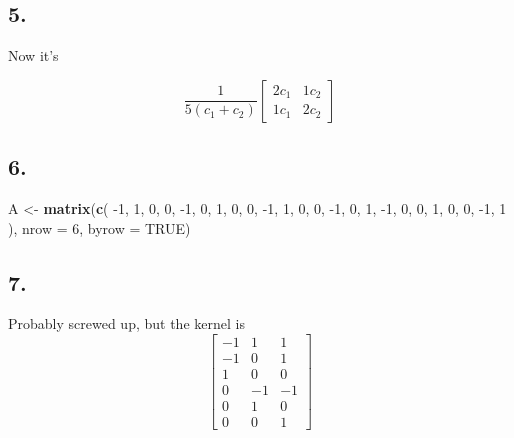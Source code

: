 \documentclass[]{article}
\newenvironment{Shaded}{\begin{snugshade}}{\end{snugshade}}
\newcommand{\DataTypeTok}[1]{\textcolor[rgb]{0.00,0.34,0.68}{#1}}
\newcommand{\DecValTok}[1]{\textcolor[rgb]{0.69,0.50,0.00}{#1}}
\newcommand{\KeywordTok}[1]{\textcolor[rgb]{0.12,0.11,0.11}{\textbf{#1}}}
\newcommand{\NormalTok}[1]{\textcolor[rgb]{0.12,0.11,0.11}{#1}}
\newcommand{\OtherTok}[1]{\textcolor[rgb]{0.00,0.43,0.16}{#1}}
\newcommand{\StringTok}[1]{\textcolor[rgb]{0.75,0.01,0.01}{#1}}
\begin{document}
\hypertarget{section-4}{%
\subsection{5.}\label{section-4}}

Now it's

\[
    \frac {1}{5(c_1 + c_2)}\begin{bmatrix}
    2c_1 & 1c_2\\
    1c_1 & 2c_2
    \end{bmatrix}
\]

\hypertarget{section-5}{%
\subsection{6.}\label{section-5}}

\begin{Shaded}
\begin{Highlighting}[]
\NormalTok{A <-}\StringTok{ }\KeywordTok{matrix}\NormalTok{(}\KeywordTok{c}\NormalTok{(}
  \DecValTok{-1}\NormalTok{, }\DecValTok{1}\NormalTok{, }\DecValTok{0}\NormalTok{, }\DecValTok{0}\NormalTok{,}
  \DecValTok{-1}\NormalTok{, }\DecValTok{0}\NormalTok{, }\DecValTok{1}\NormalTok{, }\DecValTok{0}\NormalTok{,}
  \DecValTok{0}\NormalTok{, }\DecValTok{-1}\NormalTok{, }\DecValTok{1}\NormalTok{, }\DecValTok{0}\NormalTok{,}
  \DecValTok{0}\NormalTok{, }\DecValTok{-1}\NormalTok{, }\DecValTok{0}\NormalTok{, }\DecValTok{1}\NormalTok{,}
  \DecValTok{-1}\NormalTok{, }\DecValTok{0}\NormalTok{, }\DecValTok{0}\NormalTok{, }\DecValTok{1}\NormalTok{,}
  \DecValTok{0}\NormalTok{, }\DecValTok{0}\NormalTok{, }\DecValTok{-1}\NormalTok{, }\DecValTok{1}
\NormalTok{), }\DataTypeTok{nrow =} \DecValTok{6}\NormalTok{, }\DataTypeTok{byrow =} \OtherTok{TRUE}\NormalTok{)}
\end{Highlighting}
\end{Shaded}

\hypertarget{section-6}{%
\subsection{7.}\label{section-6}}

Probably screwed up, but the kernel is \[
 \begin{bmatrix}
 -1 & 1 & 1\\
 -1 & 0 & 1\\
 1 & 0 & 0\\
 0 & -1 & -1\\
 0 & 1 & 0\\
 0 & 0 & 1
 \end{bmatrix}
\]
\end{document}
